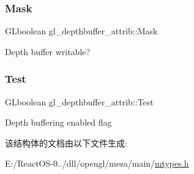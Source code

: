 \subsubsection{\texorpdfstring{Mask}{Mask}}
{\footnotesize\ttfamily G\+Lboolean gl\+\_\+depthbuffer\+\_\+attrib\+::\+Mask}

Depth buffer writable? \mbox{\label{structgl__depthbuffer__attrib_a5dae4c685f4395771db65d9fa8e72434}} 
\subsubsection{\texorpdfstring{Test}{Test}}
{\footnotesize\ttfamily G\+Lboolean gl\+\_\+depthbuffer\+\_\+attrib\+::\+Test}

Depth buffering enabled flag 

该结构体的文档由以下文件生成\+:\begin{DoxyCompactItemize}
\item 
E\+:/\+React\+O\+S-\/0../dll/opengl/mesa/main/\hyperlink{mtypes_8h}{mtypes.\+h}\end{DoxyCompactItemize}
